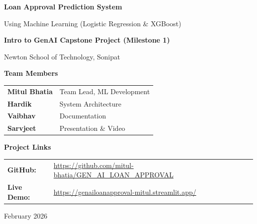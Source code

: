 \documentclass[12pt,a4paper]{article}
\begin{document}
\begin{titlepage}
    \centering
    \vspace*{1cm}
    
    {\Huge\bfseries Loan Approval Prediction System\par}
    \vspace{0.5cm}
    {\Large Using Machine Learning (Logistic Regression \& XGBoost)\par}
    
    \vspace{1.5cm}
    
    {\large\textbf{Intro to GenAI Capstone Project (Milestone 1)}\par}
    \vspace{0.3cm}
    {\large Newton School of Technology, Sonipat\par}
    
    \vspace{2cm}
    
    {\Large\bfseries Team Members\par}
    \vspace{0.5cm}
    \begin{tabular}{ll}
        \textbf{Mitul Bhatia} & Team Lead, ML Development \\
        \textbf{Hardik} & System Architecture \\
        \textbf{Vaibhav} & Documentation \\
        \textbf{Sarvjeet} & Presentation \& Video \\
    \end{tabular}
    
    \vspace{1.5cm}
    
    {\large\bfseries Project Links\par}
    \vspace{0.3cm}
    \begin{tabular}{ll}
        \textbf{GitHub:} & \url{https://github.com/mitul-bhatia/GEN_AI_LOAN_APPROVAL} \\
        \textbf{Live Demo:} & \url{https://genailoanapproval-mitul.streamlit.app/} \\
    \end{tabular}
    
    \vspace{1cm}
    
    
    \vfill
    
    {\large February 2026\par}
\end{titlepage}
\end{document}
